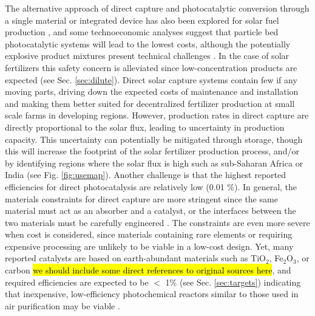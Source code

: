 

The alternative approach of direct capture and photocatalytic conversion through a single material or integrated device has also been explored for solar fuel production \cite{Montoya_2017, Lewis_2016, Pinaud_2013}, and some technoeconomic analyses suggest that particle bed photocatalytic systems will lead to the lowest costs, although the potentially explosive product mixtures present technical challenges \cite{Pinaud_2013}. In the case of solar fertilizers this safety concern is alleviated since low-concentration products are expected (see Sec. \ref{sec:dilute}). Direct solar capture systems contain few if any moving parts, driving down the expected costs of maintenance and installation and making them better suited for decentralized fertilizer production at small scale farms in developing regions. However, production rates in direct capture are directly proportional to the solar flux, leading to uncertainty in production capacity. This uncertainty can potentially be mitigated through storage, though this will increase the footprint of the solar fertilizer production process, and/or by identifying regions where the solar flux is high such as sub-Saharan Africa or India (see Fig. \ref{fig:usemap}). Another challenge is that the highest reported efficiencies for direct photocatalysis are relatively low (0.01 \%). In general, the materials constraints for direct capture are more stringent since the same material must act as an absorber and a catalyst, or the interfaces between the two materials must be carefully engineered \cite{Montoya_2017}. The constraints are even more severe when cost is considered, since materials containing rare elements or requiring expensive processing are unlikely to be viable in a low-cost design. Yet, many reported catalysts are based on earth-abundant materials such as TiO$_2$, Fe$_2$O$_3$, or carbon \cite{Medford_2017} \needcite \hl{we should include some direct references to original sources here}, and required efficiencies are expected to be $<$ 1\% (see Sec. \ref{sec:targets}) indicating that inexpensive, low-efficiency photochemical reactors similar to those used in air purification may be viable \cite{Birnie2006, Bhatkhande_2001,Parkin_2005}.

